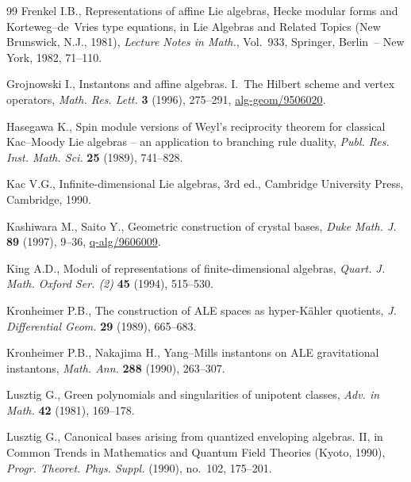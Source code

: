 \begin{thebibliography}{99}
 Frenkel I.B., Representations of af\/f\/ine {L}ie algebras, {H}ecke modular
  forms and {K}orteweg--de~{V}ries type equations, in Lie Algebras and Related
  Topics ({N}ew {B}runswick, {N}.{J}., 1981), {\it Lecture Notes in Math.}, Vol.~933,
  Springer, Berlin~-- New York, 1982, 71--110. %

Grojnowski I., Instantons and af\/f\/ine algebras. I.~The Hilbert
  scheme and vertex operators, {\it Math. Res. Lett.} \textbf{3} (1996),  275--291,
  \href{http://arxiv.org/abs/alg-geom/9506020}{alg-geom/9506020}. %

Hasegawa K., Spin module versions of Weyl's reciprocity theorem for
  classical Kac--Moody Lie algebras -- an application to branching rule
  duality, {\it Publ. Res. Inst. Math. Sci.} \textbf{25} (1989),  741--828.

 Kac V.G., Inf\/inite-dimensional Lie algebras, 3rd ed., Cambridge
  University Press, Cambridge, 1990. %

Kashiwara M., Saito Y., Geometric construction of crystal bases, {\it Duke
  Math. J.} \textbf{89} (1997),  9--36,  \mbox{\href{http://arxiv.org/abs/q-alg/9606009}{q-alg/9606009}}. %

 King A.D.,  Moduli of representations of f\/inite-dimensional algebras,
 {\it Quart. J. Math. Oxford Ser. (2)} \textbf{45} (1994),  515--530.

 Kronheimer P.B.,  The construction of {ALE} spaces as hyper-{K}\"ahler
  quotients, {\it J. Differential Geom.} \textbf{29} (1989),    665--683.

 Kronheimer P.B., Nakajima H., Yang--Mills instantons on {ALE}
  gravitational instantons, {\it Math. Ann.} \textbf{288} (1990),   263--307.

Lusztig G.,  Green polynomials and singularities of unipotent classes,
 {\it  Adv. in Math.} \textbf{42} (1981),  169--178. %

Lusztig G.,  Canonical bases arising from quantized enveloping algebras.
  II, in Common
  Trends in Mathematics and Quantum Field Theories (Kyoto, 1990),
  {\it Progr. Theoret. Phys. Suppl.} (1990), no.~102, 175--201. %


\end{thebibliography}
